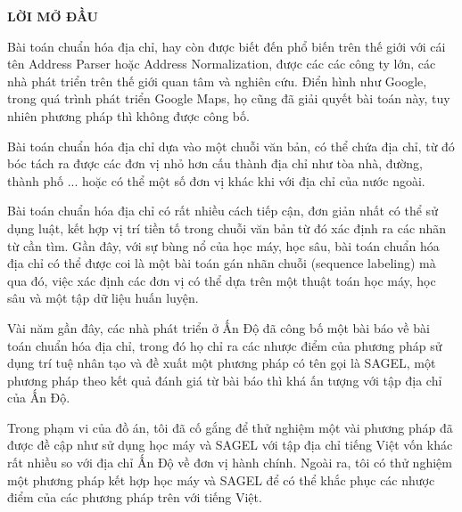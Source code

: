




\vspace*{2cm}
\centerline{\bf \large\MakeUppercase{Lời mở đầu}}
\vspace{20pt}
Bài toán chuẩn hóa địa chỉ, hay còn được biết đến phổ biến trên thế giới với cái tên Address Parser hoặc Address Normalization, được các các công ty lớn, các nhà phát triển trên thế giới quan tâm và nghiên cứu. Điển hình như Google, trong quá trình phát triển Google Maps, họ cũng đã giải quyết bài toán này, tuy nhiên phương pháp thì không được công bố. 

Bài toán chuẩn hóa địa chỉ dựa vào một chuỗi văn bản, có thể chứa địa chỉ, từ đó bóc tách ra được các đơn vị nhỏ hơn cấu thành địa chỉ như tòa nhà, đường, thành phố ... hoặc có thể một số đơn vị khác khi với địa chỉ của nước ngoài.

Bài toán chuẩn hóa địa chỉ có rất nhiều cách tiếp cận, đơn giản nhất có thể sử dụng luật, kết hợp vị trí tiền tố  trong chuỗi văn bản từ đó xác định ra các nhãn từ cần tìm. Gần đây, với sự bùng nổ của học máy, học sâu, bài toán chuẩn hóa địa chỉ có thể được coi là một bài toán gán nhãn chuỗi (sequence labeling) mà qua đó, việc xác định các đơn vị có thể dựa trên một thuật toán học máy, học sâu và một tập dữ liệu huấn luyện.

Vài năm gần đây, các nhà phát triển ở Ấn Độ đã công bố một bài báo về bài toán chuẩn hóa địa chỉ, trong đó họ chỉ ra các nhược điểm của phương pháp sử dụng trí tuệ nhân tạo và đề xuất một phương pháp có tên gọi là SAGEL, một phương pháp theo kết quả đánh giá từ bài báo thì khá ấn tượng với tập địa chỉ của Ấn Độ.

Trong phạm vi của đồ án, tôi đã cố gắng để thử nghiệm một vài phương pháp đã được đề cập như sử dụng học máy và SAGEL với tập địa chỉ tiếng Việt vốn khác rất nhiều so với địa chỉ Ấn Độ về đơn vị hành chính. Ngoài ra, tôi có thử nghiệm một phương pháp kết hợp học máy và SAGEL để có thể khắc phục các nhược điểm của các phương pháp trên với tiếng Việt.







